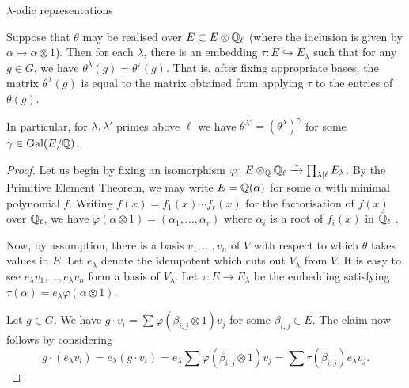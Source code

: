 \documentclass[11pt,a4paper]{article}
\begin{document}
\begin{section}{$\lambda$-adic representations}
\begin{proposition}
    
    Suppose that $\theta$ may be realised over $E  \subset E\otimes \mathbb{Q}_\ell$ (where the inclusion is given by $\alpha \mapsto \alpha \otimes 1$).
    Then for each $\lambda$, there is an embedding $\tau \colon E \hookrightarrow E_\lambda$ such that for any  $g \in G$, we have $\theta^\lambda(g) = \theta^\tau(g)$.
    That is, after fixing appropriate bases, the matrix $\theta^\lambda(g)$ is equal to the matrix obtained from applying $\tau$ to the entries of $\theta(g)$.

    In particular, for $\lambda, \lambda'$ primes above $\ell$ we have $\theta^{\lambda'}=(\theta^{\lambda})^\gamma$ for some $\gamma \in \Gal(E/\QQ)$.
\end{proposition}

\begin{proof}
    Let us begin by fixing an isomorphism $\varphi \colon E\otimes_{\mathbb{Q}} \mathbb{Q}_\ell \xrightarrow{\sim} \prod_{\lambda|\ell} E_\lambda$.
    By the Primitive Element Theorem, we may write $E = \mathbb{Q}(\alpha)$ for some $\alpha$ with minimal polynomial $f$.
    Writing $f(x) = f_1(x) \cdots f_r(x)$ for the factorisation of $f(x)$ over $\mathbb{Q}_\ell$, we have $\varphi(\alpha \otimes 1) = (\alpha_1, \ldots , \alpha_r)$ where $\alpha_i$ is a root of $f_i(x)$ in $\Bar{\mathbb{Q}}_\ell$ \cite[Pg. 163]{Neukirch_ant_book}.

    Now, by assumption, there is a basis $v_1, \ldots, v_n$ of $V$ with respect to which $\theta$ takes values in $E$.
    Let $e_\lambda$ denote the idempotent which cuts out $V_\lambda$ from $V$.
    It is easy to see $e_\lambda v_1,\ldots,e_\lambda v_n$ form a basis of $V_\lambda$.
    Let $\tau\colon E \rightarrow E_\lambda$ be the embedding satisfying $\tau (\alpha) = e_\lambda \varphi(\alpha \otimes 1) $.

    Let $g \in G$.
    We have $g\cdot v_i = \sum \varphi(\beta_{i,j} \otimes 1) v_j$ for some $\beta_{i,j} \in E$.
    The claim now follows by considering \[g \cdot (e_\lambda v_i) = e_\lambda( g \cdot  v_i) = e_\lambda \sum \varphi(\beta_{i,j} \otimes 1) v_j = \sum \tau(\beta_{i,j}) e_\lambda v_j.\]
\end{proof}

\end{section}
\end{document}
